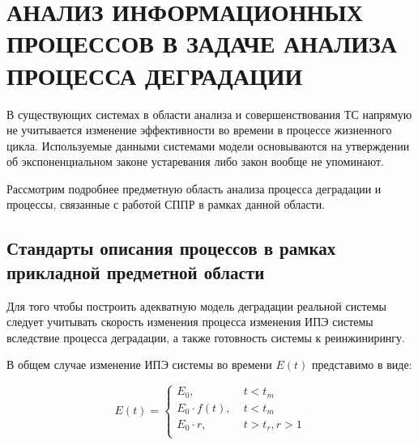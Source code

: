 \section{АНАЛИЗ ИНФОРМАЦИОННЫХ ПРОЦЕССОВ В ЗАДАЧЕ АНАЛИЗА ПРОЦЕССА ДЕГРАДАЦИИ}

В существующих системах в области анализа и совершенствования ТС напрямую не учитывается изменение эффективности во времени в процессе жизненного цикла. 
Используемые данными системами модели основываются на утверждении об экспоненциальном законе устаревания либо закон вообще не упоминают. 

Рассмотрим подробнее предметную область анализа процесса деградации и процессы, связанные с работой СППР в рамках данной области.

\subsection{Стандарты описания процессов в рамках прикладной предметной области}
Для того чтобы построить адекватную модель деградации реальной системы следует учитывать скорость изменения процесса изменения ИПЭ системы вследствие процесса деградации, а также готовность системы к реинжинирингу. 

В общем случае изменение ИПЭ системы во времени $E(t)$ представимо в виде:

\begin{equation} \label{eq:oldModel}
    E(t) = \begin{cases}
        E_0,            & \; t<t_m         \\
        E_0 \cdot f(t), & \; t<t_m         \\
        E_0 \cdot r,          & \; t>t_r, r>1 \\
    \end{cases}
\end{equation}



